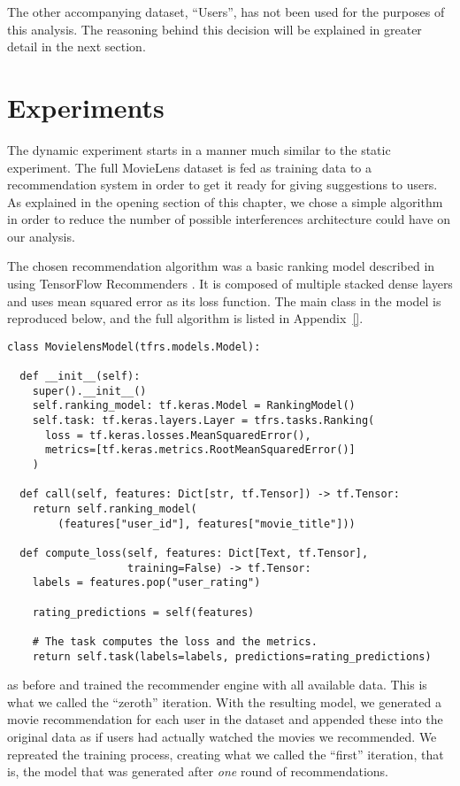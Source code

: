 The other accompanying dataset, ``Users'', has not been used for the purposes of
this analysis. The reasoning behind this decision will be explained in greater
detail in the next section.

\section{Experiments}
\label{sec:experiments04}

The dynamic experiment starts in a manner much similar to the static experiment.
The full MovieLens dataset is fed as training data to a recommendation system in
order to get it ready for giving suggestions to users. As explained in the
opening section of this chapter, we chose a simple algorithm in order to reduce
the number of possible interferences architecture could have on our analysis.

The chosen recommendation algorithm was a basic ranking model described in
\citet{} using TensorFlow Recommenders \citep{}. It is composed of multiple
stacked dense layers and uses mean squared error as its loss function. The main
class in the model is reproduced below, and the full algorithm is listed in
Appendix~\ref{}.

\begin{verbatim}
class MovielensModel(tfrs.models.Model):

  def __init__(self):
    super().__init__()
    self.ranking_model: tf.keras.Model = RankingModel()
    self.task: tf.keras.layers.Layer = tfrs.tasks.Ranking(
      loss = tf.keras.losses.MeanSquaredError(),
      metrics=[tf.keras.metrics.RootMeanSquaredError()]
    )

  def call(self, features: Dict[str, tf.Tensor]) -> tf.Tensor:
    return self.ranking_model(
        (features["user_id"], features["movie_title"]))

  def compute_loss(self, features: Dict[Text, tf.Tensor],
                   training=False) -> tf.Tensor:
    labels = features.pop("user_rating")

    rating_predictions = self(features)

    # The task computes the loss and the metrics.
    return self.task(labels=labels, predictions=rating_predictions)
\end{verbatim}

as before and trained the recommender engine
with all available data. This is what we called the ``zeroth'' iteration. With the
resulting model, we generated a movie recommendation for each user in the
dataset and appended these into the original data as if users had actually
watched the movies we recommended. We repreated the training process, creating
what we called the ``first'' iteration, that is, the model that was generated
after \emph{one} round of recommendations.

